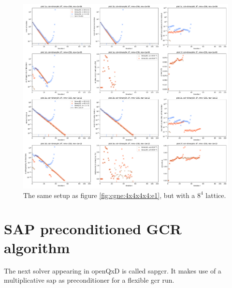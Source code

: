 \documentclass{article}
\theoremstyle{plain} %
\theoremstyle{convention} %
\theoremstyle{remark} %
\numberwithin{equation}{section}
\begin{document}
\begin{figure}[h]
    \centering
    \includegraphics[width=1.0\textwidth]{plots/cgne_8x8x8x8_e1}
    \caption{The same setup as figure \ref{fig:cgne:4x4x4x4:e1}, but with a $8^4$ lattice.}
    \label{fig:cgne:8x8x8x8:e1}
\end{figure}

\section{SAP preconditioned GCR algorithm}

\label{sec:sap_gcr}

The next solver appearing in openQxD is called \acrshort{sapgcr}. It makes use of a multiplicative \acrfull{sap} as preconditioner for a flexible \acrfull{gcr} run.
\end{document}
